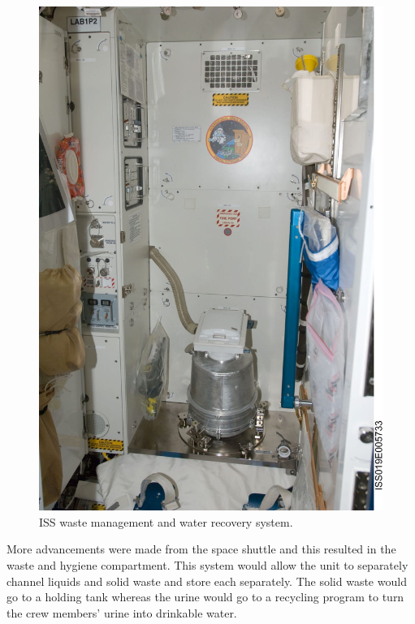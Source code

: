     \begin{figure}
        \vspace{-1em}
        \centering
        \includegraphics[width = \linewidth]{figs/iss_space_toilet.jpeg}
        \caption[ISS Waste Collection System]{ISS waste management and water recovery system.}
        \label{fig:iss_space_toilet}
    \end{figure}

    More advancements were made from the space shuttle and this resulted in the waste and hygiene compartment. This system would allow the unit to separately channel liquids and solid waste and store each separately. The solid waste would go to a holding tank whereas the urine would go to a recycling program to turn the crew members' urine into drinkable water. \cite{ref:iss_background}

